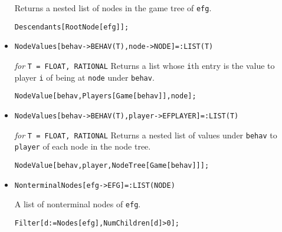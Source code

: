 \begin{itemize}
\bd 
Returns a nested list of nodes in the game tree of \verb+efg+.  
\begin{verbatim}
Descendants[RootNode[efg]];
\end{verbatim} 
\ed

\item{}
\protect \large \begin{verbatim}
NodeValues[behav->BEHAV(T),node->NODE]=:LIST(T)
\end{verbatim}\normalsize

{\it for} {\tt T = FLOAT, RATIONAL}
\bd 
Returns a list whose \verb+i+th entry is the value to player \verb+i+
of being at \verb+node+ under \verb+behav+.
\begin{verbatim}
NodeValue[behav,Players[Game[behav]],node];
\end{verbatim} 
\ed

\item{}
\protect \large \begin{verbatim}
NodeValues[behav->BEHAV(T),player->EFPLAYER]=:LIST(T)
\end{verbatim}\normalsize

{\it for} {\tt T = FLOAT, RATIONAL} 
\bd 
Returns a nested list of values under \verb+behav+ to \verb+player+ of
each node in the node tree.
\begin{verbatim}
NodeValue[behav,player,NodeTree[Game[behav]]];
\end{verbatim} 
\ed



\item{}
\protect \large \begin{verbatim}
NonterminalNodes[efg->EFG]=:LIST(NODE)
\end{verbatim}\normalsize

\bd 
A list of nonterminal nodes of \verb+efg+.
\begin{verbatim}
Filter[d:=Nodes[efg],NumChildren[d]>0];
\end{verbatim} 
\ed


\end{itemize}
